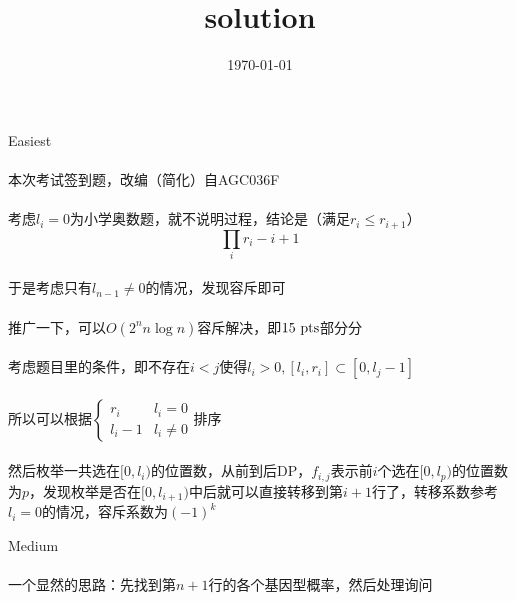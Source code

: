\documentclass[UTF8]{ctexart}
\begin{document}
\title{solution}
\author{}
\date{\today}
\maketitle

\clearpage

\begin{center}
	\large{Easiest}
\end{center}
\paragraph{}本次考试签到题，改编（简化）自AGC036F
\paragraph{}考虑$l_i=0$为小学奥数题，就不说明过程，结论是（满足$r_i\le r_{i+1}$）
$$
\prod_{i} r_i-i+1
$$
\paragraph{}于是考虑只有$l_{n-1}\not=0$的情况，发现容斥即可
\paragraph{}推广一下，可以$O(2^nn\log n)$容斥解决，即$15~\rm pts$部分分
\paragraph{}考虑题目里的条件，即不存在$i<j$使得$l_i>0,[l_i,r_i]\subset [0,l_j-1]$
\paragraph{}所以可以根据$\begin{cases}r_i&l_i=0\\l_i-1&l_i\not=0\end{cases}$排序
\paragraph{}然后枚举一共选在$[0,l_i)$的位置数，从前到后DP，$f_{i,j}$表示前$i$个选在$[0,l_p)$的位置数为$p$，发现枚举是否在$[0,l_{i+1})$中后就可以直接转移到第$i+1$行了，转移系数参考$l_i=0$的情况，容斥系数为$(-1)^k$

\clearpage

\begin{center}
	\large{Medium}
\end{center}

\paragraph{}一个显然的思路：先找到第$n+1$行的各个基因型概率，然后处理询问
\end{document}
